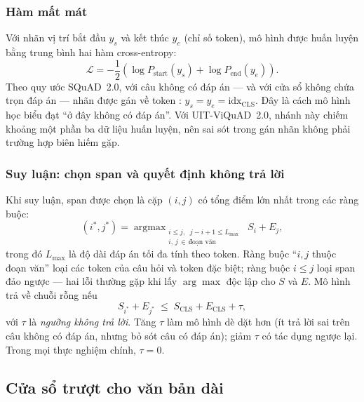 \subsubsection{Hàm mất mát}

Với nhãn vị trí bắt đầu $y_s$ và kết thúc $y_e$ (chỉ số token), mô hình được huấn luyện
bằng trung bình hai hàm cross-entropy:
\begin{equation}
  \mathcal{L} = -\frac{1}{2}\left( \log P_{\text{start}}(y_s) + \log P_{\text{end}}(y_e) \right).
  \label{eq:qaloss}
\end{equation}
Theo quy ước SQuAD~2.0, với câu không có đáp án --- và với cửa sổ không chứa trọn đáp án
--- nhãn được gán về token \code{[CLS]}: $y_s = y_e = \text{idx}_{\text{CLS}}$. Đây là
cách mô hình học biểu đạt ``ở đây không có đáp án''. Với UIT-ViQuAD~2.0, nhánh này chiếm
khoảng một phần ba dữ liệu huấn luyện, nên sai sót trong gán nhãn không phải trường hợp
biên hiếm gặp.

\subsubsection{Suy luận: chọn span và quyết định không trả lời}

Khi suy luận, span được chọn là cặp $(i, j)$ có tổng điểm lớn nhất trong các ràng buộc:
\begin{equation}
  (i^\ast, j^\ast) = \mathop{\arg\max}_{\substack{i \le j,\;\; j - i + 1 \le L_{\max} \\ i,\, j \,\in\, \text{đoạn văn}}} \; S_i + E_j ,
  \label{eq:span}
\end{equation}
trong đó $L_{\max}$ là độ dài đáp án tối đa tính theo token. Ràng buộc ``$i, j$ thuộc đoạn
văn'' loại các token của câu hỏi và token đặc biệt; ràng buộc $i \le j$ loại span đảo
ngược --- hai lỗi thường gặp khi lấy $\arg\max$ độc lập cho $S$ và $E$. Mô hình trả về
chuỗi rỗng nếu
\begin{equation}
  S_{i^\ast} + E_{j^\ast} \;\le\; S_{\text{CLS}} + E_{\text{CLS}} + \tau ,
  \label{eq:null}
\end{equation}
với $\tau$ là \emph{ngưỡng không trả lời}. Tăng $\tau$ làm mô hình dè dặt hơn (ít trả lời
sai trên câu không có đáp án, nhưng bỏ sót câu có đáp án); giảm $\tau$ có tác dụng ngược
lại. Trong mọi thực nghiệm chính, $\tau = 0$.

\subsection{Cửa sổ trượt cho văn bản dài}
\label{sec:windowing}

